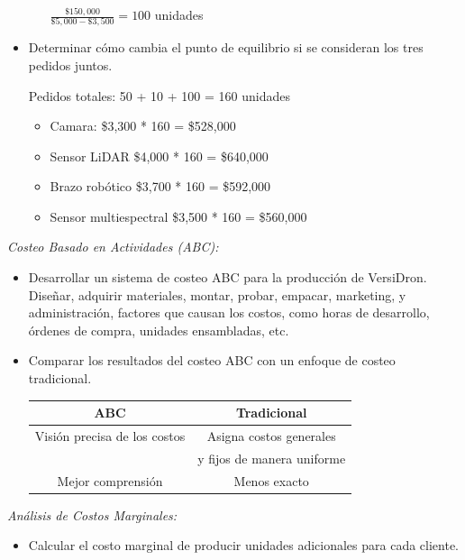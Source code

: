 \documentclass[letterpaper,12pt]{article}
\begin{document}
\begin{sloppypar}
\begin{itemize}
\begin{center}
\begin{itemize}
        $\displaystyle \frac{\$150,000}{\$5,000 - \$3,500} = 100$ unidades
    \end{itemize}
    \end{center} 
    \item Determinar cómo cambia el punto de equilibrio si se consideran los tres pedidos juntos. 
    \begin{center}
    Pedidos totales: 50 + 10 + 100 = 160 unidades
    \begin{itemize}
        \item Camara: \$3,300 * 160 = \$528,000
        \item Sensor LiDAR \$4,000 * 160 = \$640,000
        \item Brazo robótico \$3,700 * 160 = \$592,000
        \item Sensor multiespectral \$3,500 * 160 = \$560,000
    \end{itemize}
    \end{center}
\end{itemize}
\newpage
\textit{Costeo Basado en Actividades (ABC):}
\begin{itemize}
    \item Desarrollar un sistema de costeo ABC para la producción de VersiDron. \\  Diseñar, adquirir materiales, montar, probar, empacar, marketing, y administración, factores que causan los costos, como horas de desarrollo, órdenes de compra, unidades ensambladas, etc.
    \item Comparar los resultados del costeo ABC con un enfoque de costeo tradicional.
    \begin{center}
        \begin{tabular}[H]{|c|c|} \hline 
            ABC & Tradicional \\ \hline
            Visión precisa de los costos & Asigna costos generales\\ 
                & y fijos de manera uniforme\\ \hline
            Mejor comprensión & Menos exacto\\ \hline
        \end{tabular}
    \end{center}
\end{itemize}
\textit{Análisis de Costos Marginales:}
\begin{itemize}
    \item Calcular el costo marginal de producir unidades adicionales para cada
    cliente.
    \begin{center}


\end{center}
\end{itemize}
\end{sloppypar}
\end{document}
